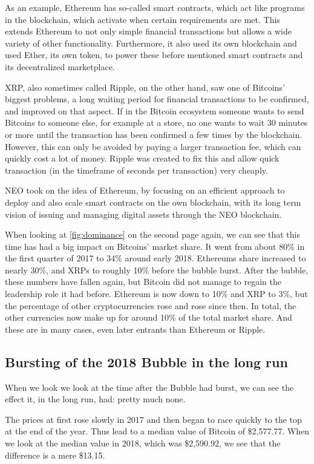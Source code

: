 \documentclass[11pt,a4paper,compsoc,conference]{IEEEtran}
\begin{document}
As an example, Ethereum has so-called smart contracts, which act like programs in the blockchain, which activate when certain requirements are met. This extends Ethereum to not only simple financial transactions but allows a wide variety of other functionality. Furthermore, it also used its own blockchain and used Ether, its own token, to power these before mentioned smart contracts and its decentralized marketplace\citep{ethereum}.

XRP, also sometimes called Ripple, on the other hand, saw one of Bitcoins' biggest problems, a long waiting period for financial transactions to be confirmed, and improved on that aspect. If in the Bitcoin ecosystem someone wants to send Bitcoins to someone else, for example at a store, no one wants to wait 30 minutes or more until the transaction has been confirmed a few times by the blockchain. However, this can only be avoided by paying a larger transaction fee, which can quickly cost a lot of money. Ripple was created to fix this and allow quick transaction (in the timeframe of seconds per transaction) very cheaply\citep{xrp}.

NEO took on the idea of Ethereum, by focusing on an efficient approach to deploy and also scale smart contracts on the own blockchain, with its long term vision of issuing and managing digital assets through the NEO blockchain\citep{neo}.

When looking at \autoref{fig:dominance} on the second page again, we can see that this time has had a big impact on Bitcoins' market share. It went from about 80\% in the first quarter of 2017 to 34\% around early 2018. Ethereums share increased to nearly 30\%, and XRPs to roughly 10\% before the bubble burst. After the bubble, these numbers have fallen again, but Bitcoin did not manage to regain the leadership role it had before. Ethereum is now down to 10\% and XRP to 3\%, but the percentage of other cryptocurrencies rose and rose since then. In total, the other currencies now make up for around 10\% of the total market share. And these are in many cases, even later entrants than Ethereum or Ripple.


\subsection{Bursting of the 2018 Bubble in the long run}
When we look we look at the time after the Bubble had burst, we can see the effect it, in the long run, had: pretty much none. 

The prices at first rose slowly in 2017 and then began to race quickly to the top at the end of the year. Thus lead to a median value of Bitcoin of \$2,577.77. When we look at the median value in 2018, which was \$2,590.92, we see that the difference is a mere \$13.15. 
\end{document}
